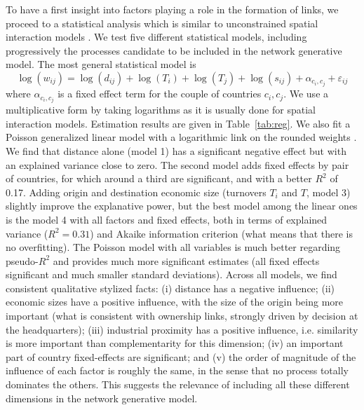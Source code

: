 \documentclass[11pt]{article}
\begin{document}
To have a first insight into factors playing a role in the formation of links, we proceed to a statistical analysis which is similar to unconstrained spatial interaction models \cite{wilson1975some}. We test five different statistical models, including progressively the processes candidate to be included in the network generative model. The most general statistical model is
\[
\log(w_{ij}) = \log(d_{ij}) + \log(T_i) + \log(T_j) + \log(s_{ij}) + \alpha_{c_i,c_j} + \varepsilon_{ij}
\]
where $\alpha_{c_i,c_j}$ is a fixed effect term for the couple of countries $c_i,c_j$. We use a multiplicative form by taking logarithms as it is usually done for spatial interaction models. Estimation results are given in Table~\ref{tab:reg}. We also fit a Poisson generalized linear model with a logarithmic link on the rounded weights \cite{flowerdew1988fitting}. We find that distance alone (model 1) has a significant negative effect but with an explained variance close to zero. The second model adds fixed effects by pair of countries, for which around a third are significant, and with a better $R^2$ of 0.17. Adding origin and destination economic size (turnovers $T_i$ and $T$, model 3) slightly improve the explanative power, but the best model among the linear ones is the model 4 with all factors and fixed effects, both in terms of explained variance ($R^2 = 0.31$) and Akaike information criterion (what means that there is no overfitting). The Poisson model with all variables is much better regarding pseudo-$R^2$ and provides much more significant estimates (all fixed effects significant and much smaller standard deviations). Across all models, we find consistent qualitative stylized facts: (i) distance has a negative influence; (ii) economic sizes have a positive influence, with the size of the origin being more important (what is consistent with ownership links, strongly driven by decision at the headquarters); (iii) industrial proximity has a positive influence, i.e. similarity is more important than complementarity for this dimension; (iv) an important part of country fixed-effects are significant; and (v) the order of magnitude of the influence of each factor is roughly the same, in the sense that no process totally dominates the others. This suggests the relevance of including all these different dimensions in the network generative model.
\end{document}
